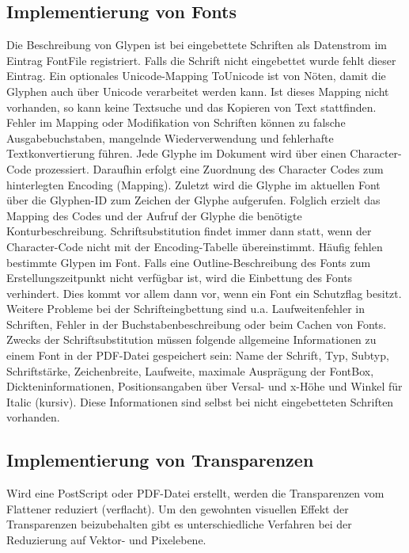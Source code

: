 \subsection{Implementierung von Fonts}
Die Beschreibung von Glypen ist bei eingebettete Schriften als Datenstrom im Eintrag FontFile registriert. Falls die Schrift nicht eingebettet wurde fehlt dieser Eintrag. Ein optionales Unicode-Mapping ToUnicode ist von Nöten, damit die Glyphen auch über Unicode verarbeitet werden kann. Ist dieses Mapping nicht vorhanden, so kann keine Textsuche und das Kopieren von Text stattfinden. Fehler im Mapping oder Modifikation von Schriften können zu falsche Ausgabebuchstaben, mangelnde Wiederverwendung und fehlerhafte Textkonvertierung führen. Jede Glyphe im Dokument wird über einen Character-Code prozessiert. Daraufhin erfolgt eine Zuordnung des Character Codes zum hinterlegten Encoding (Mapping). Zuletzt wird die Glyphe im aktuellen Font über die Glyphen-ID zum Zeichen der Glyphe aufgerufen. Folglich erzielt das Mapping des Codes und der Aufruf der Glyphe die benötigte Konturbeschreibung. Schriftsubstitution findet immer dann statt, wenn der Character-Code nicht mit der Encoding-Tabelle übereinstimmt. Häufig fehlen bestimmte Glypen im Font. Falls eine Outline-Beschreibung des Fonts zum Erstellungszeitpunkt nicht verfügbar ist, wird die Einbettung des Fonts verhindert. Dies kommt vor allem dann vor, wenn ein Font ein Schutzflag besitzt. Weitere Probleme bei der Schrifteingbettung sind u.a. Laufweitenfehler in Schriften, Fehler in der Buchstabenbeschreibung oder beim Cachen von Fonts. Zwecks der Schriftsubstitution müssen folgende allgemeine Informationen zu einem Font in der PDF-Datei gespeichert sein: Name der Schrift, Typ, Subtyp, Schriftstärke, Zeichenbreite, Laufweite, maximale Ausprägung der FontBox, Dickteninformationen, Positionsangaben über Versal- und x-Höhe und Winkel für Italic (kursiv). Diese Informationen sind selbst bei nicht eingebetteten Schriften vorhanden. \cite{schneeberger}

\subsection{Implementierung von Transparenzen}
Wird eine PostScript oder PDF-Datei erstellt, werden die Transparenzen vom Flattener reduziert (verflacht). Um den gewohnten visuellen Effekt der Transparenzen beizubehalten gibt es unterschiedliche Verfahren bei der Reduzierung auf Vektor- und Pixelebene. 